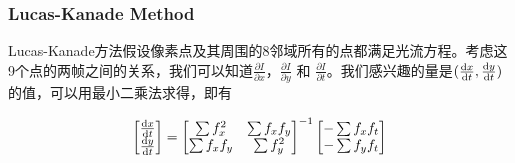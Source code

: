 \begin{frame}
    \frametitle{Lucas-Kanade Method}

    Lucas-Kanade方法假设像素点及其周围的8邻域所有的点都满足光流方程。考虑这9个点的两帧之间的关系，我们可以知道$\frac{\partial I}{\partial x}$，$\frac{\partial I}{\partial y}$ 和 $\frac{\partial I}{\partial t}$。我们感兴趣的量是$(\frac{\mathrm{d} x}{\mathrm{d} t}, \frac{\mathrm{d} y}{\mathrm{d} t})$的值，可以用最小二乘法求得，即有

    \begin{equation}
        \begin{bmatrix}
            \frac{\mathrm{d} x}{\mathrm{d} t} \\
            \frac{\mathrm{d} y}{\mathrm{d} t}
        \end{bmatrix} = \begin{bmatrix}
            \sum f_x^2   & \sum f_x f_y \\
            \sum f_x f_y & \sum f_y^2   \\
        \end{bmatrix}^{-1} \begin{bmatrix}
            -\sum f_x f_t \\
            -\sum f_y f_t \\
        \end{bmatrix}
    \end{equation}

\end{frame}